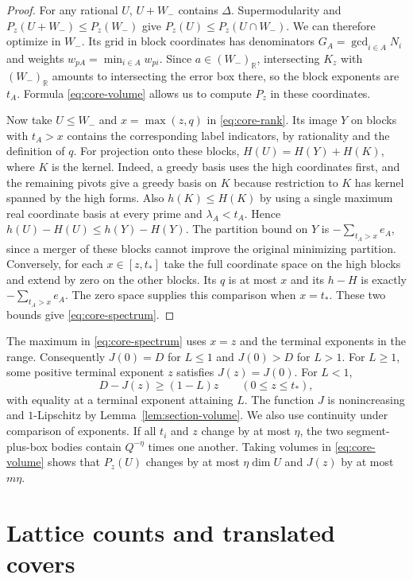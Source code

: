 \documentclass[11pt,reqno,a4paper]{amsart}
\theoremstyle{remark}
\numberwithin{equation}{section}
\begin{document}
\begin{proof}
For any rational $U$, $U+W_-$ contains $\Delta$. Supermodularity and
$P_z(U+W_-)\le P_z(W_-)$ give $P_z(U)\le P_z(U\cap W_-)$. We can
therefore optimize in $W_-$. Its grid in block coordinates has
denominators $G_A=\gcd_{i\in A}N_i$ and weights $w_{pA}=\min_{i\in A}w_{pi}$. Since
$a\in (W_-)_{\mathbb R}$, intersecting $K_z$ with $(W_-)_{\mathbb R}$
amounts to intersecting the error box there, so the block exponents
are $t_A$. Formula \eqref{eq:core-volume} allows us to compute
$P_z$ in these coordinates.

Now take $U\le W_-$ and $x=\max(z,q)$ in \eqref{eq:core-rank}.
Its image $Y$ on blocks with $t_A>x$ contains the corresponding label
indicators, by rationality and the definition of $q$. For projection
onto these blocks, $H(U)=H(Y)+H(K)$, where $K$ is the kernel.
Indeed, a greedy basis uses the high coordinates first, and the
remaining pivots give a greedy basis on $K$ because restriction to
$K$ has kernel spanned by the high forms. Also $h(K)\le H(K)$
by using a single maximum real coordinate basis at every prime
and $\lambda_A<t_A$. Hence $h(U)-H(U)\le h(Y)-H(Y)$. The
partition bound on $Y$ is $-\sum_{t_A>x}e_A$, since a merger of
these blocks cannot improve the original minimizing partition.
Conversely, for each $x\in[z,t_*]$ take the full coordinate space
on the high blocks and extend by zero on the other blocks. Its
$q$ is at most $x$ and its $h-H$ is exactly $-\sum_{t_A>x}e_A$.
The zero space supplies this comparison when $x=t_*$. These two
bounds give \eqref{eq:core-spectrum}.
\end{proof}

The maximum in \eqref{eq:core-spectrum} uses $x=z$ and the terminal
exponents in the range. Consequently $J(0)=D$ for $L\le 1$ and
$J(0)>D$ for $L>1$. For $L\ge 1$, some positive terminal exponent
$z$ satisfies $J(z)=J(0)$. For $L<1$,
\begin{equation}\label{eq:core-slope}
 D-J(z)\ge (1-L)z\qquad (0\le z\le t_*),
\end{equation}
with equality at a terminal exponent attaining $L$. The function
$J$ is nonincreasing and $1$-Lipschitz by Lemma~\ref{lem:section-volume}.
We also use continuity under comparison of exponents. If all $t_i$
and $z$ change by at most $\eta$, the two segment-plus-box bodies
contain $Q^{-\eta}$ times one another. Taking volumes in
\eqref{eq:core-volume} shows that $P_z(U)$ changes by at most
$\eta\dim U$ and $J(z)$ by at most $m\eta$.


\section{Lattice counts and translated covers}\label{sec:translated-counts}
\end{document}
